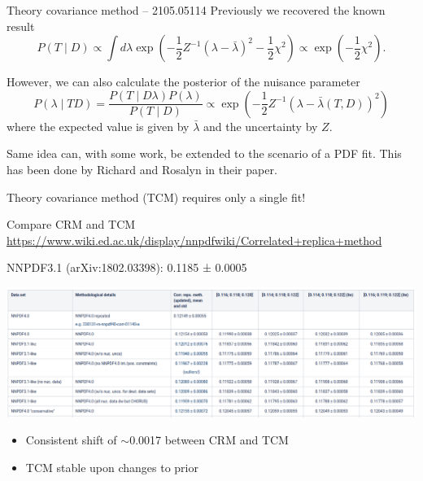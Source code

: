 \documentclass[aspectratio=169, 8pt,t]{beamer}
\begin{document}
\begin{frame}{Theory covariance method -- 2105.05114}
  Previously we recovered the known result
  $$
    P(T \mid D) \propto \int d \lambda \exp \left(-\frac{1}{2} Z^{-1}(\lambda-\bar{\lambda})^2-\frac{1}{2} \chi^2\right) \propto \exp \left(-\frac{1}{2} \chi^2\right).
  $$

  However, we can also calculate the posterior of the nuisance parameter
  \begin{equation*}
    P(\lambda \mid T D)=\frac{P(T \mid D \lambda) P(\lambda)}{P(T \mid D)} \propto \exp \left(-\frac{1}{2} Z^{-1}(\lambda-\bar{\lambda}(T, D))^2\right)
  \end{equation*}
  where the expected value is given by $\bar{\lambda}$ and the uncertainty by $Z$.
  \vspace*{1em}

  Same idea can, with some work, be extended to the scenario of a PDF fit. This has been done by Richard and Rosalyn in their paper.

  \vspace*{1em}
  Theory covariance method (TCM) requires only a single fit!
\end{frame}


\begin{frame}{Compare CRM and TCM}
  \vspace*{-1em}
  \url{https://www.wiki.ed.ac.uk/display/nnpdfwiki/Correlated+replica+method}

  NNPDF3.1 (arXiv:1802.03398): 0.1185 ± 0.0005

  \includegraphics[width=1.0\textwidth]{figures/alphasresultstable.png}
  
  \begin{itemize}
    \item Consistent shift of $\sim$0.0017 between CRM and TCM
    \item TCM stable upon changes to prior
  \end{itemize}

\end{frame}
\end{document}

